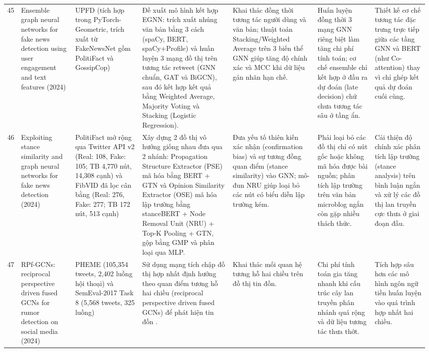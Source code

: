\documentclass[11pt,a4paper]{extreport}
\begin{document}
\begin{landscape}
\begin{longtable}{@{}C{0.6cm}p{3.6cm}p{2.7cm}p{4.8cm}p{3.6cm}p{3.6cm}p{3.6cm}@{}}
45 & Ensemble graph neural networks for fake news detection using user engagement and text features (2024) \cite{noauthor_ensemble_2024} & UPFD (tích hợp trong PyTorch-Geometric, trích xuất từ FakeNewsNet gồm PolitiFact và GossipCop) & Đề xuất mô hình kết hợp EGNN: trích xuất nhúng văn bản bằng 3 cách (spaCy, BERT, spaCy+Profile) và huấn luyện 3 mạng đồ thị trên tương tác retweet (GNN chuẩn, GAT và BiGCN), sau đó kết hợp kết quả bằng Weighted Average, Majority Voting và Stacking (Logistic Regression). & Khai thác đồng thời tương tác người dùng và văn bản; thuật toán Stacking/Weighted Average trên 3 biến thể GNN giúp tăng độ chính xác và MCC khi dữ liệu gán nhãn hạn chế. & Huấn luyện đồng thời 3 mạng GNN riêng biệt làm tăng chi phí tính toán; cơ chế ensemble chỉ kết hợp ở đầu ra dự đoán (late decision) chứ chưa tương tác sâu ở tầng ẩn. & Thiết kế cơ chế tương tác đặc trưng trực tiếp giữa các tầng GNN và BERT (như Co-attention) thay vì chỉ ghép kết quả dự đoán cuối cùng. \\ 

46 & Exploiting stance similarity and graph neural networks for fake news detection (2024) \cite{noauthor_exploiting_2024} & PolitiFact mở rộng qua Twitter API v2 (Real: 108, Fake: 105; TB 4,770 nút, 14,308 cạnh) và FibVID đã lọc cân bằng (Real: 276, Fake: 277; TB 172 nút, 513 cạnh) & Xây dựng 2 đồ thị vô hướng giống nhau đưa qua 2 nhánh: Propagation Structure Extractor (PSE) mã hóa bằng BERT + GTN và Opinion Similarity Extractor (OSE) mã hóa lập trường bằng stanceBERT + Node Removal Unit (NRU) + Top-K Pooling + GTN, gộp bằng GMP và phân loại qua MLP. & Đưa yếu tố thiên kiến xác nhận (confirmation bias) và sự tương đồng quan điểm (stance similarity) vào GNN; mô-đun NRU giúp loại bỏ các nút có biểu diễn lập trường kém. & Phải loại bỏ các đồ thị chỉ có nút gốc hoặc không mã hóa được bài nguồn; phân tích lập trường trên văn bản microblog ngắn còn gặp nhiều thách thức. & Cải thiện độ chính xác phân tích lập trường (stance analysis) trên bình luận ngắn và xử lý các đồ thị lan truyền cực thưa ở giai đoạn đầu. \\ 

47 & RPf-GCNs: reciprocal perspective driven fused GCNs for rumor detection on social media (2024) \cite{noauthor_rpf-gcns_2024} & PHEME (105,354 tweets, 2,402 luồng hội thoại) và SemEval-2017 Task 8 (5,568 tweets, 325 luồng) & Sử dụng mạng tích chập đồ thị hợp nhất định hướng theo quan điểm tương hỗ hai chiều (reciprocal perspective driven fused GCNs) để phát hiện tin đồn \cite{noauthor_rpf-gcns_2024}. & Khai thác mối quan hệ tương hỗ hai chiều trên đồ thị tin đồn. & Chi phí tính toán gia tăng nhanh khi cấu trúc cây lan truyền phân nhánh quá rộng và dữ liệu tương tác thưa thớt. & Tích hợp sâu hơn các mô hình ngôn ngữ tiền huấn luyện vào quá trình hợp nhất hai chiều. \\ 


\end{longtable}
\end{landscape}
\end{document}
